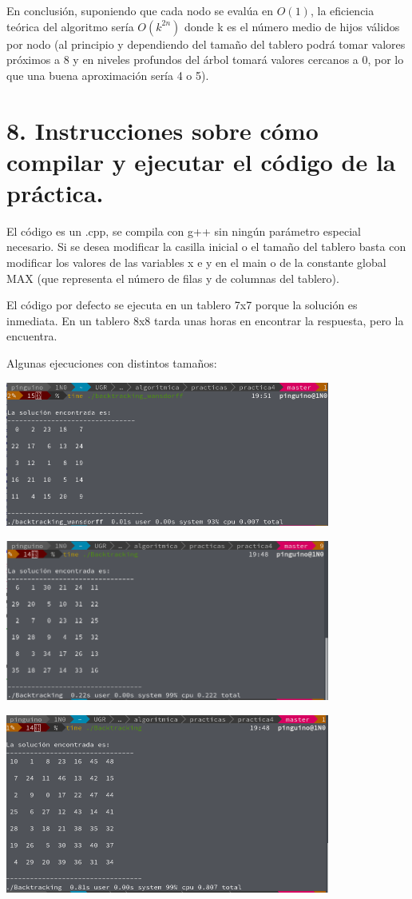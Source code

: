 \documentclass[a4paper, 11pt]{article}
\begin{document}
En conclusión, suponiendo que cada nodo se evalúa en $O(1)$, la eficiencia teórica del algoritmo sería $O(k^{2n})$ donde k es el número medio de hijos válidos por nodo (al principio y dependiendo del tamaño del tablero podrá tomar valores próximos a 8 y en niveles profundos del árbol tomará valores cercanos a 0, por lo que una buena aproximación sería 4 o 5).




\section{8. Instrucciones sobre cómo compilar y ejecutar el código de la práctica.}

El código es un .cpp, se compila con g++ sin ningún parámetro especial necesario. 
Si se desea modificar la casilla inicial o el tamaño del tablero basta con modificar los valores de las variables x e y en el main o de la constante global MAX (que representa el número de filas y de columnas del tablero).

El código por defecto se ejecuta en un tablero 7x7 porque la solución es inmediata. En un tablero 8x8 tarda unas horas en encontrar la respuesta, pero la encuentra.

Algunas ejecuciones con distintos tamaños:

\includegraphics[width=0.8\textwidth]{0.png}

\includegraphics[width=0.8\textwidth]{1.png}								

\includegraphics[width=0.8\textwidth]{2.png}
\end{document}

